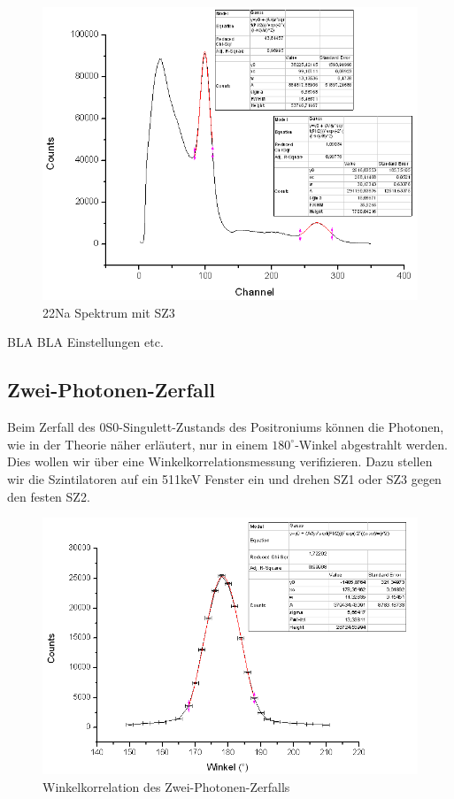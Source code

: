 \begin{figure}
 \includegraphics[width=\textwidth]{Graphen/SZ3.png}
 \caption{22Na Spektrum mit SZ3}
\end{figure}  

BLA BLA Einstellungen etc.

\subsection{Zwei-Photonen-Zerfall}

Beim Zerfall des 0S0-Singulett-Zustands des Positroniums können die Photonen, wie in der Theorie näher erläutert, nur in einem $180^\circ$-Winkel abgestrahlt werden. Dies wollen wir über eine Winkelkorrelationsmessung verifizieren. Dazu stellen wir die Szintilatoren auf ein 511keV Fenster ein und drehen SZ1 oder SZ3 gegen den festen SZ2. 
\begin{figure}
 \includegraphics[width=\textwidth]{Graphen/180K.png}
 \caption{Winkelkorrelation des Zwei-Photonen-Zerfalls}
\end{figure}

